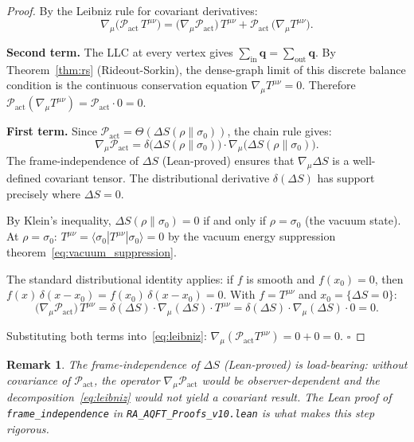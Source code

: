 \documentclass[11pt,a4paper]{article}
\newtheorem{remark}[theorem]{Remark}
\newcommand{\Pact}{\mathcal{P}_{\mathrm{act}}}
\newcommand{\dS}{\Delta S}
\begin{document}
\begin{proof}
By the Leibniz rule for covariant derivatives:
\begin{equation}
  \nabla_\mu\!\bigl(\Pact\,T^{\mu\nu}\bigr)
  = \bigl(\nabla_\mu \Pact\bigr)\,T^{\mu\nu}
    + \Pact\,\bigl(\nabla_\mu T^{\mu\nu}\bigr).
  \label{eq:leibniz}
\end{equation}

\textbf{Second term.}
The LLC at every vertex gives
$\sum_{\mathrm{in}} \mathbf{q} = \sum_{\mathrm{out}} \mathbf{q}$.
By Theorem~\ref{thm:rs} (Rideout-Sorkin), the dense-graph limit of
this discrete balance condition is the continuous conservation equation
$\nabla_\mu T^{\mu\nu} = 0$. Therefore
$\Pact(\nabla_\mu T^{\mu\nu}) = \Pact \cdot 0 = 0$.

\textbf{First term.}
Since $\Pact = \Theta(\dS(\rho\|\sigma_0))$, the chain rule gives:
\begin{equation}
  \nabla_\mu \Pact
  = \delta\!\bigl(\dS(\rho\|\sigma_0)\bigr)
    \cdot \nabla_\mu\!\bigl(\dS(\rho\|\sigma_0)\bigr).
\end{equation}
The frame-independence of $\dS$ (Lean-proved) ensures that
$\nabla_\mu\dS$ is a well-defined covariant tensor. The distributional
derivative $\delta(\dS)$ has support precisely where $\dS = 0$.

By Klein's inequality, $\dS(\rho\|\sigma_0) = 0$ if and only if
$\rho = \sigma_0$ (the vacuum state). At $\rho = \sigma_0$:
$T^{\mu\nu} = \langle\sigma_0|T^{\mu\nu}|\sigma_0\rangle = 0$
by the vacuum energy suppression theorem~\eqref{eq:vacuum_suppression}.

The standard distributional identity applies: if $f$ is smooth and
$f(x_0) = 0$, then $f(x)\,\delta(x - x_0) = f(x_0)\,\delta(x-x_0) = 0$.
With $f = T^{\mu\nu}$ and $x_0 = \{\dS = 0\}$:
\begin{equation}
  \bigl(\nabla_\mu \Pact\bigr)\,T^{\mu\nu}
  = \delta(\dS)\cdot\nabla_\mu(\dS)\cdot T^{\mu\nu}
  = \delta(\dS)\cdot\nabla_\mu(\dS)\cdot 0 = 0.
\end{equation}

Substituting both terms into~\eqref{eq:leibniz}:
$\nabla_\mu(\Pact T^{\mu\nu}) = 0 + 0 = 0$. \hfill$\square$
\end{proof}

\begin{remark}
The frame-independence of $\dS$ (Lean-proved) is load-bearing: without
covariance of $\Pact$, the operator $\nabla_\mu\Pact$ would be
observer-dependent and the decomposition~\eqref{eq:leibniz} would not
yield a covariant result. The Lean proof of \texttt{frame\_independence}
in \texttt{RA\_AQFT\_Proofs\_v10.lean} is what makes this step rigorous.
\end{remark}
\end{document}
